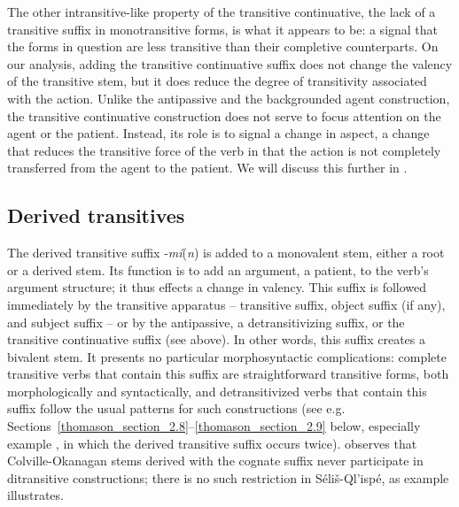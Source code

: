 \documentclass[output=paper,colorlinks,citecolor=brown]{langscibook}
\begin{document}
The other intransitive-like property of the transitive continuative,
the lack of a transitive suffix in monotransitive forms, is what it
appears to be: a signal that the forms in question are less transitive
than their completive counterparts.  On our analysis, adding the
transitive continuative suffix does not change the valency of the
transitive stem, but it does reduce the degree of transitivity
associated with the action.  Unlike the antipassive and the
backgrounded agent construction, the transitive continuative
construction does not serve to focus attention on the agent or the
patient.  Instead, its role is to signal a change in aspect, a change
that reduces the transitive force of the verb in that the action is
not completely transferred from the agent to the patient.  We will
discuss this further in .

\subsection{Derived transitives}  %
\label{thomason_section_2.7}

The derived transitive suffix -\emph{m\'i}(\emph{n}) is added to a
monovalent stem, either a root or a derived stem.  Its function is to
add an argument, a patient, to the verb's argument structure; it thus
effects a change in valency.  This suffix is followed immediately by
the transitive apparatus -- transitive suffix, object suffix (if
any), and subject suffix -- or by the antipassive, a detransitivizing
suffix, or the transitive continuative suffix (see  above).
In other words, this suffix creates a bivalent stem.  It presents no
particular morphosyntactic complications: complete transitive verbs
that contain this suffix are straightforward transitive forms, both
morphologically and syntactically, and detransitivized verbs that
contain this suffix follow the usual patterns for such constructions
(see e.g. Sections~\ref{thomason_section_2.8}--\ref{thomason_section_2.9} below, 
especially example , in which the derived
transitive suffix occurs twice).  \citet[430]{Mattina:1982} observes that
Colville-Okanagan stems derived with the cognate suffix never
participate in ditransitive constructions; there is no such
restriction in S\'eli\v{s}-Ql'isp\'e, as example  illustrates.
\end{document}
